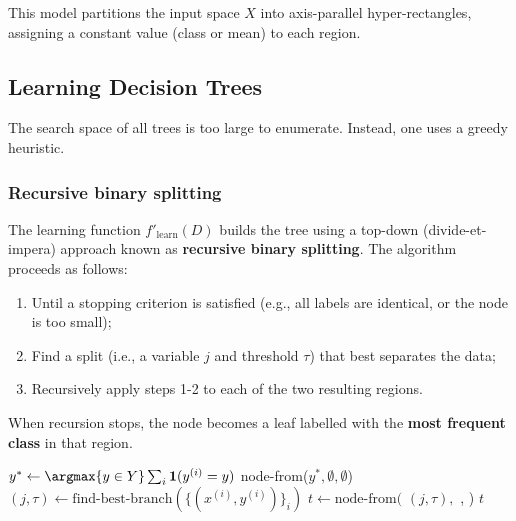 This model partitions the input space $X$ into axis-parallel hyper-rectangles, assigning a constant value (class or mean) to each region.


\subsection{Learning Decision Trees}
\label{subsec:learning-decision-trees}

The search space of all trees is too large to enumerate. Instead, one uses a greedy heuristic.

\subsubsection{Recursive binary splitting}
\label{subsubsec:recursive-binary-splitting}

The learning function $f'_{\text{learn}}(D)$ builds the tree using a top-down (divide-et-impera) approach known as \textbf{recursive binary splitting}. The algorithm proceeds as follows:
\begin{enumerate}
    \item Until a stopping criterion is satisfied (e.g., all labels are identical, or the node is too small);
    \item Find a split (i.e., a variable $j$ and threshold $\tau$) that best separates the data;
    \item Recursively apply steps 1-2 to each of the two resulting regions.
\end{enumerate}
When recursion stops, the node becomes a leaf labelled with the \textbf{most frequent class} in that region.

\begin{algorithm}[H]
    \caption{Templated $f'_{\text{learn}}$}
    \begin{algorithmic}[1]
                \State $y^* \gets \argmax{y \in Y} \sum_i \mathbf{1}(y^{(i)} = y)$ 
                \State \Return node-from($y^*, \emptyset, \emptyset$)
            \Else {}
                \State $(j, \tau) \gets \text{find-best-branch}(\{(x^{(i)}, y^{(i)})\}_i)$
                \State $t \gets \text{node-from}($
                \State \hspace{2em} $(j, \tau),$
                \State \hspace{2em} , 
                \State \hspace{2em} ) 
                \State \Return $t$
            \EndIf
        \EndFunction
    \end{algorithmic}
\end{algorithm}


